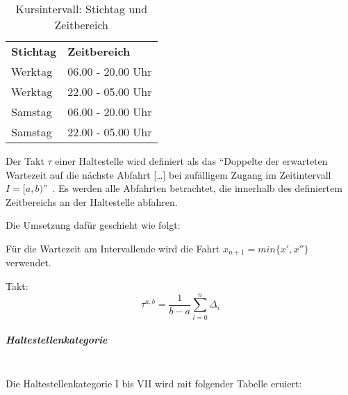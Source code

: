 \begin{table}[H]
    \centering
    \begin{tabular}[c]{l l}
        \midrule
        \textbf{Stichtag}
                                & \textbf{Zeitbereich}\\
        Werktag
                                & 06.00 - 20.00 Uhr\\
        Werktag
                                & 22.00 - 05.00 Uhr\\
        Samstag
                                & 06.00 - 20.00 Uhr\\
        Samstag
                                & 22.00 - 05.00 Uhr\\
        \bottomrule
    \end{tabular}
    \caption{Kursintervall: Stichtag und Zeitbereich}
    \label{table:Ermittlung Kursintervall: Stichtag und Zeitbereich}
\end{table}

Der Takt $\tau$ einer Haltestelle wird definiert als das "`Doppelte der erwarteten Wartezeit auf die nächste Abfahrt [\ldots] bei zufälligem Zugang im Zeitintervall $I = [a,b)$"'~\cite{visum_manual_formula}. Es werden alle Abfahrten betrachtet, die innerhalb des definiertem Zeitbereichs an der Haltestelle abfahren.

Die Umsetzung dafür geschieht wie folgt:


Für die Wartezeit am Intervallende wird die Fahrt $x_{n+1} = min\{x', x''\}$ verwendet.

Takt:
\[
    \tau^{a, b} = \frac{1}{b - a} \sum_{i=0}^n \Delta_i
\]


\subparagraph{Haltestellenkategorie}~\\
\label{Berechnungsmethodik OeVGK18:Haltestellenkategorie}
Die Haltestellenkategorie I bis VII wird mit folgender Tabelle eruiert:

